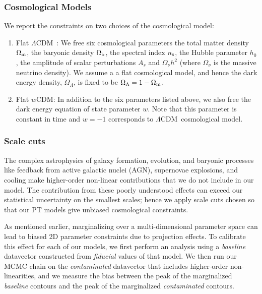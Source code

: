 \documentclass[aps, prd,twocolumn,superscriptaddress,nofootinbib,preprintnumbers]{revtex4-1}
\newcommand{\lcdm}{$\Lambda$CDM}
\newcommand{\wcdm}{$w$CDM}
\begin{document}
\subsubsection{Cosmological Models}
\label{sec:cosmo_models}
We report the constraints on two choices of the cosmological model:
\begin{enumerate}
    \item Flat \lcdm\ : We free six cosmological parameters the total matter density $\Omega_{\rm m}$, the baryonic density $\Omega_{\rm b}$,  the spectral index $n_{\rm s}$, the Hubble parameter $h_0$, the amplitude of scalar perturbations $A_s$ and $\Omega_\nu h^2$ (where $\Omega_\nu$ is the massive neutrino density). We assume a a flat cosmological model, and hence the dark energy density, $\Omega_\Lambda$, is fixed to be $\Omega_\Lambda = 1 - \Omega_{\rm m}$.
    \item Flat \wcdm : In addition to the six parameters listed above, we also free the dark energy equation of state parameter $w$. Note that this parameter is constant in time and $w=-1$ corresponds to \lcdm\ cosmological model. 
\end{enumerate}


\subsubsection{Scale cuts}\label{sec:scale_cuts}

The complex astrophysics of galaxy formation, evolution, and baryonic processes like feedback from active galactic nuclei (AGN), supernovae explosions, and cooling make higher-order non-linear contributions that we do not include in our model. The contribution from these poorly understood effects can exceed our statistical uncertainty on the smallest scales; hence we apply scale cuts chosen so that our PT models give unbiased cosmological constraints.%

As mentioned earlier, marginalizing over a multi-dimensional parameter space can lead to biased 2D parameter constraints due to projection effects. To calibrate this effect for each of our models, we first perform an analysis using a \textit{baseline} datavector constructed from \textit{fiducial} values of that model. 
We then run our MCMC chain on the \textit{contaminated} datavector that includes higher-order non-linearities, and we measure the bias between the peak of the marginalized \textit{baseline} contours and the peak of the marginalized \textit{contaminated} contours. 
\end{document}
